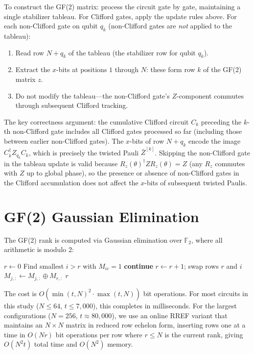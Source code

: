\documentclass[a4paper,twocolumn,11pt]{quantumarticle}
\begin{document}
To construct the GF(2) matrix: process the circuit gate by gate, maintaining a single stabilizer tableau.
For Clifford gates, apply the update rules above.
For each non-Clifford gate on qubit $q_k$ (non-Clifford gates are \emph{not} applied to the tableau):
\begin{enumerate}
\item Read row $N + q_k$ of the tableau (the stabilizer row for qubit $q_k$).
\item Extract the $x$-bits at positions $1$ through $N$: these form row $k$ of the GF(2) matrix $z$.
\item Do not modify the tableau---the non-Clifford gate's $Z$-component commutes through subsequent Clifford tracking.
\end{enumerate}

\noindent The key correctness argument: the cumulative Clifford circuit $C_k$ preceding the $k$-th non-Clifford gate includes all Clifford gates processed so far (including those between earlier non-Clifford gates).
The $x$-bits of row $N + q_k$ encode the image $C_k^\dagger Z_{q_k} C_k$, which is precisely the twisted Pauli $\bar{Z}^{[k]}$.
Skipping the non-Clifford gate in the tableau update is valid because $R_z(\theta)^\dagger Z R_z(\theta) = Z$ (any $R_z$ commutes with $Z$ up to global phase), so the presence or absence of non-Clifford gates in the Clifford accumulation does not affect the $x$-bits of subsequent twisted Paulis.

\section{GF(2) Gaussian Elimination}
\label{app:gf2_elimination}

The GF(2) rank is computed via Gaussian elimination over $\mathbb{F}_2$, where all arithmetic is modulo 2:

\begin{algorithmic}[1]
\State $r \gets 0$  
    \State Find smallest $i > r$ with $M_{ic} = 1$
     \textbf{continue} \EndIf
    \State $r \gets r + 1$; swap rows $r$ and $i$
        \State $M_{j,:} \gets M_{j,:} \oplus M_{r,:}$ 
    \EndFor
\EndFor
\State \Return $r$
\EndFunction
\end{algorithmic}

\noindent The cost is $O(\min(t,N)^2 \cdot \max(t,N))$ bit operations.
For most circuits in this study ($N \le 64$, $t \le 7{,}000$), this completes in milliseconds.
For the largest configurations ($N = 256$, $t \approx 80{,}000$), we use an online RREF variant that maintains an $N \times N$ matrix in reduced row echelon form, inserting rows one at a time in $O(Nr)$ bit operations per row where $r \le N$ is the current rank, giving $O(N^2 t)$ total time and $O(N^2)$ memory.
\end{document}
